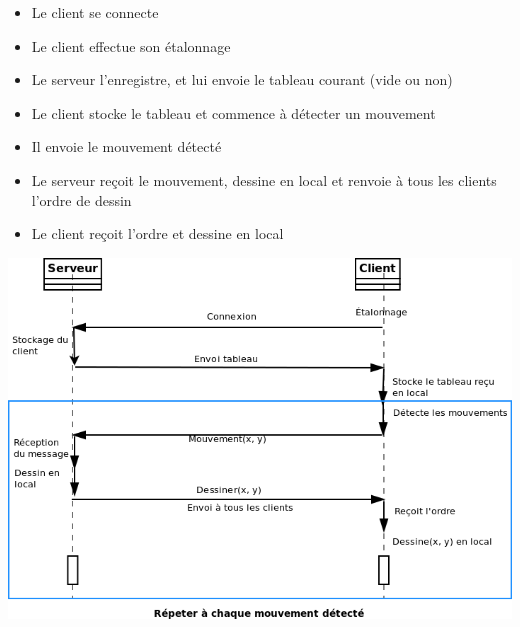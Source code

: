 \documentclass{article}
\begin{document}
\begin{itemize}
	\item Le client se connecte
	\item Le client effectue son étalonnage
	\item Le serveur l'enregistre, et lui envoie le tableau courant (vide ou non)
	\item Le client stocke le tableau et commence à détecter un mouvement
	\item Il envoie le mouvement détecté
	\item Le serveur reçoit le mouvement, dessine en local et renvoie à tous les clients l'ordre de dessin
	\item Le client reçoit l'ordre et dessine en local
\end{itemize}

\begin{center}
	\includegraphics[scale=0.5]{../uml/sequence_reseau.png}
\end{center}

\end{document}
